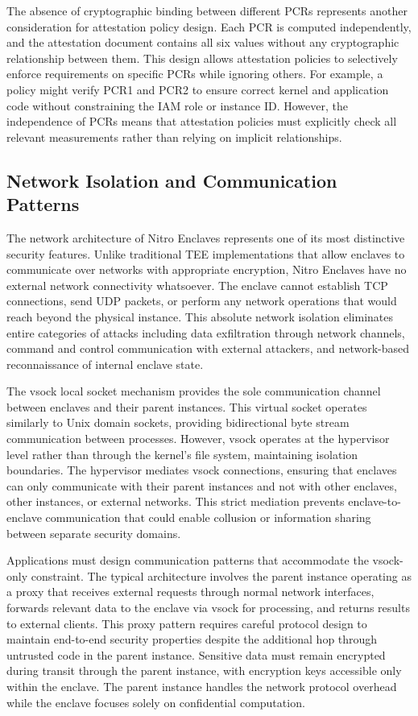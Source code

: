 The absence of cryptographic binding between different PCRs represents another consideration for attestation policy design. Each PCR is computed independently, and the attestation document contains all six values without any cryptographic relationship between them. This design allows attestation policies to selectively enforce requirements on specific PCRs while ignoring others. For example, a policy might verify PCR1 and PCR2 to ensure correct kernel and application code without constraining the IAM role or instance ID. However, the independence of PCRs means that attestation policies must explicitly check all relevant measurements rather than relying on implicit relationships.

\subsection{Network Isolation and Communication Patterns}

The network architecture of Nitro Enclaves represents one of its most distinctive security features. Unlike traditional TEE implementations that allow enclaves to communicate over networks with appropriate encryption, Nitro Enclaves have no external network connectivity whatsoever. The enclave cannot establish TCP connections, send UDP packets, or perform any network operations that would reach beyond the physical instance. This absolute network isolation eliminates entire categories of attacks including data exfiltration through network channels, command and control communication with external attackers, and network-based reconnaissance of internal enclave state.

The vsock local socket mechanism provides the sole communication channel between enclaves and their parent instances. This virtual socket operates similarly to Unix domain sockets, providing bidirectional byte stream communication between processes. However, vsock operates at the hypervisor level rather than through the kernel's file system, maintaining isolation boundaries. The hypervisor mediates vsock connections, ensuring that enclaves can only communicate with their parent instances and not with other enclaves, other instances, or external networks. This strict mediation prevents enclave-to-enclave communication that could enable collusion or information sharing between separate security domains.

Applications must design communication patterns that accommodate the vsock-only constraint. The typical architecture involves the parent instance operating as a proxy that receives external requests through normal network interfaces, forwards relevant data to the enclave via vsock for processing, and returns results to external clients. This proxy pattern requires careful protocol design to maintain end-to-end security properties despite the additional hop through untrusted code in the parent instance. Sensitive data must remain encrypted during transit through the parent instance, with encryption keys accessible only within the enclave. The parent instance handles the network protocol overhead while the enclave focuses solely on confidential computation.

